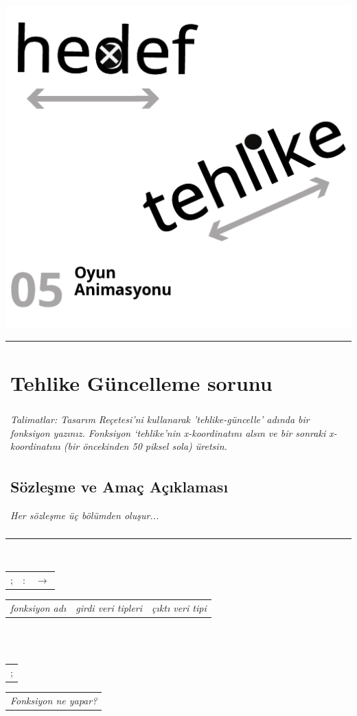 \documentclass[12pt, a4paper]{article}
\begin{document}
\newpage
\includegraphics[width=1\linewidth]{cebir-bolum-05-000.png}
\newpage
\noindent \begin{tabular}{p{16cm}}
\section*{Tehlike Güncelleme sorunu}
\\
\textit{Talimatlar: Tasarım Reçetesi’ni kullanarak ’tehlike-güncelle’ adında bir fonksiyon yazınız. Fonksiyon ‘tehlike’nin x-koordinatını alsın ve bir sonraki x-koordinatını (bir öncekinden 50 piksel sola) üretsin.}\\
\subsection*{Sözleşme ve Amaç Açıklaması}
\textit{Her sözleşme üç bölümden oluşur...}\\[10ex]
\\
\end{tabular}\\
\noindent \begin{tabular}{L{4cm} L{6cm} L{6cm}}
;\dotfill &:\dotfill &$\rightarrow$\dotfill \\
\end{tabular}
\noindent \begin{tabular}{C{4cm} C{6cm} C{6cm}}
\textit{fonksiyon adı} & \textit{girdi veri tipleri} & \textit{çıktı veri tipi} \\
\end{tabular}\\
\\
\noindent \begin{tabular}{L{17cm}}
{;\dotfill}\\
\end{tabular}
\noindent \begin{tabular}{C{17cm}}
{\textit{Fonksiyon ne yapar?}}\\
\end{tabular}
\end{document}

